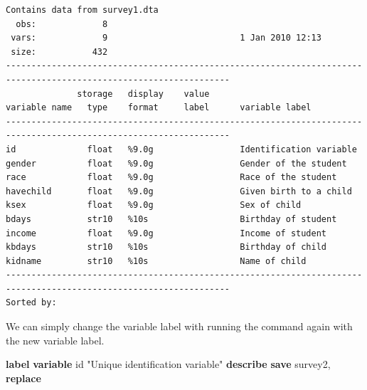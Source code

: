 \documentclass[
]{book}
\newenvironment{Shaded}{\begin{snugshade}}{\end{snugshade}}
\newcommand{\KeywordTok}[1]{\textcolor[rgb]{0.13,0.29,0.53}{\textbf{#1}}}
\newcommand{\NormalTok}[1]{#1}
\newcommand{\StringTok}[1]{\textcolor[rgb]{0.31,0.60,0.02}{#1}}
\begin{document}
\begin{verbatim}
Contains data from survey1.dta
  obs:             8                          
 vars:             9                          1 Jan 2010 12:13
 size:           432                          
------------------------------------------------------------------------------------------------------------------
              storage   display    value
variable name   type    format     label      variable label
------------------------------------------------------------------------------------------------------------------
id              float   %9.0g                 Identification variable
gender          float   %9.0g                 Gender of the student
race            float   %9.0g                 Race of the student
havechild       float   %9.0g                 Given birth to a child
ksex            float   %9.0g                 Sex of child
bdays           str10   %10s                  Birthday of student
income          float   %9.0g                 Income of student
kbdays          str10   %10s                  Birthday of child
kidname         str10   %10s                  Name of child
------------------------------------------------------------------------------------------------------------------
Sorted by: 
\end{verbatim}

We can simply change the variable label with running the command again with the new variable label.

\begin{Shaded}
\begin{Highlighting}[]
\KeywordTok{label} \KeywordTok{variable}\NormalTok{ id }\StringTok{"Unique identification variable"}
\KeywordTok{describe}
\KeywordTok{save}\NormalTok{ survey2, }\KeywordTok{replace}
\end{Highlighting}
\end{Shaded}
\end{document}
